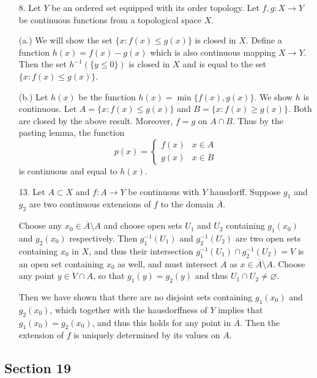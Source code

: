 \documentclass[11pt, reqno]{article}
\theoremstyle{plain}
\theoremstyle{definition}
\theoremstyle{remark}
\renewcommand{\emptyset}{\varnothing}
\begin{document}
\begin{enumerate}
    \item[8.] Let $Y$ be an ordered set equipped with its order topology. Let $f, g: X \rightarrow Y$ 
    be continuous functions from a topological space $X$. 

    (a.) We will show the set $\{x: f(x) \leq g(x)\}$ is closed in $X$. Define a function $h(x) = f(x) - g(x)$
    which is also continuous mapping $X \rightarrow Y$. Then the set $h^{-1}(\{y \leq 0\})$ is closed 
    in $X$ and is equal to the set $\{x: f(x) \leq g(x)\}$. 

    (b.) Let $h(x)$ be the function $h(x) = \operatorname{min}\{f(x), g(x)\}$. We show $h$ is continuous. 
    Let $A = \{x: f(x) \leq g(x)\}$ and $B = \{x: f(x) \geq g(x)\}$. Both are closed by the above result. 
    Moreover, $f = g$ on $A \cap B$. Thus by the pasting lemma, the function 
    \[
        p(x) = \begin{cases}
            f(x) & x \in A\\
            g(x) & x \in B
        \end{cases}
    \]
    is continuous and equal to $h(x)$. 
    
    \item[13.] Let $A \subset X$ and $f: A \rightarrow Y$ be continuous with $Y$ hausdorff. Suppose 
    $g_1$ and $g_2$ are two continuous extensions of $f$ to the domain $\overline{A}$. 

    Choose any $x_0 \in \overline{A} \setminus A$ and choose open sets $U_1$ and $U_2$ containing $g_1(x_0)$
    and $g_2(x_0)$ respectively. Then $g_1^{-1}(U_1)$ and $g_2^{-1}(U_2)$ are two open sets containing $x_0$
    in $X$, and thus their intersection $g_1^{-1}(U_1) \cap g_2^{-1}(U_2) = V$ is an open set containing $x_0$
    as well, and must intersect $A$ as $x \in \overline{A} \setminus A$. Choose any point $y \in V \cap A$,
    so that $g_1(y) = g_2(y)$ and thus $U_1 \cap U_2 \neq \emptyset$. 

    Then we have shown that there are no disjoint sets containing $g_1(x_0)$ and $g_2(x_0)$, which together
    with the hausdorffness of $Y$ implies that $g_1(x_0) = g_2(x_0)$, and thus this holds 
    for any point in $\overline{A}$. Then the extension of $f$ is uniquely determined by its values on $A$. 
\end{enumerate}

\subsection*{Section 19}
\end{document}

